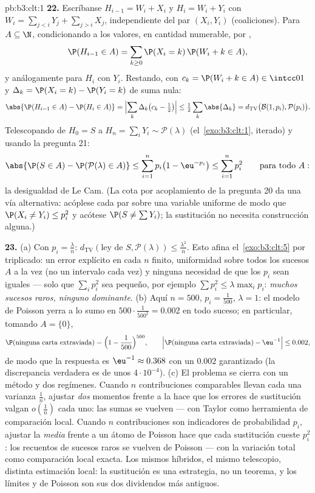 \begin{solution}{pb:b3:clt:1}
\textbf{22.} Escríbanse $H_{i-1} = W_i + X_i$ y $H_i = W_i +
Y_i$ con $W_i = \sum_{j<i}Y_j + \sum_{j>i}X_j$,
independiente del par
$(X_i, Y_i)$ (coaliciones). Para $A
\subseteq \N$, condicionando a los valores, en cantidad numerable, por
,
\[
\P(H_{i-1} \in A) = \sum_{k\geq0}\P(X_i = k)\,\P(W_i + k
\in A),
\]
y análogamente para $H_i$ con $Y_i$. Restando, con $c_k
= \P(W_i + k \in A) \in \intcc01$ y $\Delta_k = \P(X_i =
k) - \P(Y_i = k)$ de suma nula:
\[
\abs{\P(H_{i-1} \in A) - \P(H_i \in A)} =
\Bigl|\sum_k\Delta_k\bigl(c_k - \tfrac12\bigr)\Bigr| \leq
\tfrac12\sum_k\abs{\Delta_k} =
d_{\mathrm{TV}}\bigl(\mathcal B(1, p_i), \mathcal
P(p_i)\bigr) .
\]
Telescopando de $H_0 = S$ a $H_n = \sum_iY_i \sim
\mathcal P(\lambda)$ (el~\cref{exo:b3:clt:1}, iterado) y usando la
pregunta 21:
\[
\abs{\P(S \in A) - \P(\mathcal P(\lambda) \in A)} \leq
\sum_{i=1}^np_i\bigl(1 - \eu^{-p_i}\bigr) \leq
\sum_{i=1}^np_i^2
\qquad\text{para todo } A :
\]
la desigualdad de Le Cam. (La cota por acoplamiento de la pregunta 20 da
una vía alternativa: acóplese cada par sobre una variable uniforme de
modo que $\P(X_i \neq Y_i) \leq p_i^2$ y acótese $\P(S \neq \sum Y_i)$;
la sustitución no necesita construcción alguna.)

\textbf{23.} (a) Con $p_i = \frac\lambda n$:
$d_{\mathrm{TV}}(\text{ley de }S, \mathcal P(\lambda))
\leq \frac{\lambda^2}n$. Esto afina el~\cref{exo:b3:clt:5} por
triplicado: un error explícito en cada $n$ finito, uniformidad sobre
todos los sucesos $A$ a la vez (no un intervalo cada vez) y ninguna
necesidad de que los $p_i$ sean iguales --- solo que $\sum_ip_i^2$ sea
pequeño, por ejemplo $\sum p_i^2 \leq
\lambda\max_ip_i$: \emph{muchos sucesos raros, ninguno dominante}. (b)
Aquí $n = 500$, $p_i = \frac1{500}$, $\lambda = 1$: el modelo de Poisson
yerra a lo sumo en $500\cdot\frac1{500^2} = 0.002$ en todo suceso; en
particular, tomando $A = \{0\}$,
\[
\P(\text{ninguna carta extraviada}) = \Bigl(1 -
\frac1{500}\Bigr)^{500},
\qquad
\Bigl|\P(\text{ninguna carta extraviada}) - \eu^{-1}\Bigr| \leq
0.002,
\]
de modo que la respuesta es $\eu^{-1} \approx 0.368$ con un $0.002$
garantizado (la discrepancia verdadera es de unos $4\cdot10^{-4}$). (c)
El problema se cierra con un método y dos regímenes. Cuando $n$
contribuciones comparables llevan cada una varianza $\frac1n$, ajustar
\emph{dos} momentos frente a la
 hace que los errores de
sustitución valgan $o(\frac1n)$ cada uno: las sumas se vuelven
 --- con Taylor como
herramienta de comparación local. Cuando $n$ contribuciones son
indicadores de probabilidad $p_i$, ajustar la \emph{media} frente a un
átomo de Poisson hace que cada sustitución cueste $p_i^2$: los recuentos
de sucesos raros se vuelven de Poisson --- con la variación total como
comparación local exacta. Los mismos híbridos, el mismo telescopio,
distinta estimación local: la sustitución es una estrategia, no un
teorema, y los límites  y
de Poisson son sus dos dividendos más antiguos.


\end{solution}
